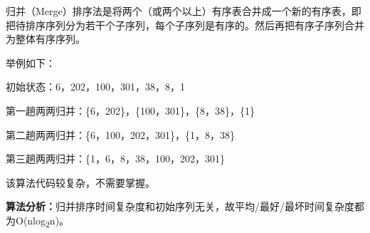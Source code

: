 {归并（Merge）排序法是{将两个（或两个以上）有序表合并成一个新的有序表}，即把待排序序列分为若干个子序列，每个子序列是有序的。然后再把有序子序列合并为整体有序序列。}

{举例如下：}

{初始状态：6，202，100，301，38，8，1}

{第一趟两两归并：\{6，202\}，\{100，301\}，\{8，38\}，\{1\}}

{第二趟两两归并：\{6，100，202，301\}，\{1，8，38\}}

{第三趟两两归并：\{1，6，8，38，100，202，301\}}

{该算法代码较复杂，不需要掌握。}

{\textbf{算法分析：}归并排序时间复杂度和初始序列无关，{故平均}}{/}{最好}{/}{最坏时间复杂度都为O(nlog}\textsubscript{{2}}{n)。}

{ }

{}
